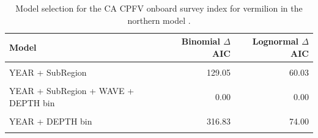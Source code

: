 \documentclass[
  english,
  a4paper,
]{article}
\begin{document}
\FloatBarrier

\begin{table}

\caption{\label{tab:tab-model-select-cpfvonboard}Model selection for the CA CPFV onboard survey index for vermilion in the northern model .}
\centering
\begin{tabular}[t]{lrr}
\toprule
Model & Binomial $\Delta$AIC & Lognormal $\Delta$AIC\\
\midrule
\cellcolor{gray!6}{1} & \cellcolor{gray!6}{797.52} & \cellcolor{gray!6}{436.25}\\
YEAR + SubRegion & 129.05 & 60.03\\
\cellcolor{gray!6}{YEAR + SubRegion + WAVE} & \cellcolor{gray!6}{120.54} & \cellcolor{gray!6}{58.72}\\
YEAR + SubRegion + WAVE + DEPTH bin & 0.00 & 0.00\\
\cellcolor{gray!6}{YEAR + WAVE + DEPTH bin} & \cellcolor{gray!6}{285.69} & \cellcolor{gray!6}{66.16}\\
\addlinespace
YEAR + DEPTH bin & 316.83 & 74.00\\
\cellcolor{gray!6}{YEAR + SubRegion + DEPTH bin} & \cellcolor{gray!6}{10.87} & \cellcolor{gray!6}{6.06}\\
\bottomrule
\end{tabular}
\end{table}

\FloatBarrier
\end{document}
